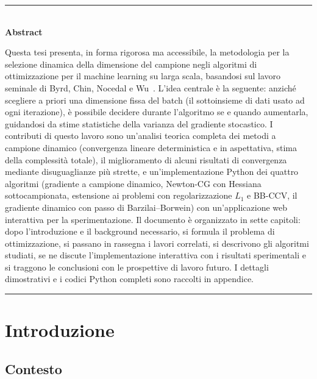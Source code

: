 \documentclass[a4paper,12pt]{article}
\numberwithin{equation}{section}
\numberwithin{figure}{section}
\numberwithin{table}{section}
\begin{document}
\newpage
\begin{center}
  \rule{0.8\textwidth}{0.4pt}\\[0.4cm]
  {\large\bfseries\color{coverblue} Abstract}\\[0.3cm]
\end{center}
\noindent
Questa tesi presenta, in forma rigorosa ma accessibile, la metodologia per la
selezione dinamica della dimensione del campione negli algoritmi di
ottimizzazione per il machine learning su larga scala, basandosi sul lavoro
seminale di Byrd, Chin, Nocedal e Wu~\cite{byrd2012}. L'idea centrale è la
seguente: anziché scegliere a priori una dimensione fissa del batch (il
sottoinsieme di dati usato ad ogni iterazione), è possibile decidere
durante l'algoritmo se e quando aumentarla, guidandosi da stime
statistiche della varianza del gradiente stocastico. I contributi di questo
lavoro sono un'analisi teorica completa dei metodi a campione dinamico
(convergenza lineare deterministica e in aspettativa, stima della complessità
totale), il miglioramento di alcuni risultati di convergenza mediante
disuguaglianze più strette, e un'implementazione Python dei quattro algoritmi
(gradiente a campione dinamico, Newton-CG con Hessiana sottocampionata,
estensione ai problemi con regolarizzazione $L_1$ e BB-CCV, il gradiente
dinamico con passo di Barzilai--Borwein) con un'applicazione web
interattiva per la sperimentazione. Il documento
è organizzato in sette capitoli: dopo l'introduzione e il background
necessario, si formula il problema di ottimizzazione, si passano in rassegna i
lavori correlati, si descrivono gli algoritmi studiati, se ne discute
l'implementazione interattiva con i risultati sperimentali e si traggono le
conclusioni con le prospettive di lavoro futuro. I dettagli dimostrativi e i
codici Python completi sono raccolti in appendice.
\begin{center}
  \rule{0.8\textwidth}{0.4pt}
\end{center}
\newpage
\tableofcontents
\clearpage

\section{Introduzione}\label{sec:introduzione}

\subsection{Contesto}
\end{document}
